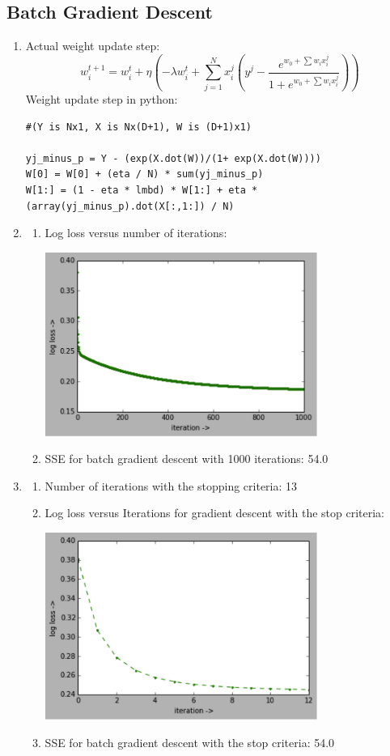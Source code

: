 \documentclass[letterpaper]{article}
\begin{document}
\subsection{Batch Gradient Descent}

\begin{enumerate}
\item Actual weight update step: 
\begin{equation}
w^{t+1}_i = w^t_i + \eta(-\lambda w^t_i + \sum_{j=1}^N{x^j_i(y^j - \frac{e^{w_0 + \sum{w_ix^j_i}}}{1 + e^{w_0 + \sum{w_ix^j_i}}})})
\end{equation}
Weight update step in python: 
\begin{verbatim}
#(Y is Nx1, X is Nx(D+1), W is (D+1)x1)

yj_minus_p = Y - (exp(X.dot(W))/(1+ exp(X.dot(W))))
W[0] = W[0] + (eta / N) * sum(yj_minus_p)
W[1:] = (1 - eta * lmbd) * W[1:] + eta * (array(yj_minus_p).dot(X[:,1:]) / N)
\end{verbatim}
\item 
\begin{enumerate}
\item Log loss versus number of iterations: 
\begin{center}
 \includegraphics[width=3.5in]{log_loss1.png}
\end{center}
\item SSE for batch gradient descent with 1000 iterations: 54.0
\end{enumerate}
\item 
\begin{enumerate}
\item Number of iterations with the stopping criteria: 13
\item Log loss versus Iterations for gradient descent with the stop criteria:
\begin{center}
\includegraphics[width=3.5in]{log_loss2.png}
\end{center}
\item SSE for batch gradient descent with the stop criteria: 54.0
\end{enumerate}


\end{enumerate}
\end{document}
